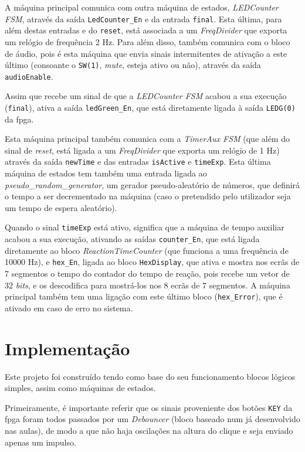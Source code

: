 \documentclass[a4paper,11pt,onecolumn]{report}
\begin{document}
A máquina principal comunica com outra máquina de estados, \textit{LEDCounter FSM}, através da saída \texttt{LedCounter\_En} e da entrada \texttt{final}. Esta última, para além destas entradas e do \texttt{reset}, está associada a um \textit{FreqDivider} que exporta um relógio de frequência 2 Hz. Para além disso, também comunica com o bloco de áudio, pois é esta máquina que envia sinais intermitentes de ativação a este último (consoante o \texttt{SW(1)}, \textit{mute}, esteja ativo ou não), através da saída \texttt{audioEnable}.

Assim que recebe um sinal de que a \textit{LEDCounter FSM} acabou a sua execução (\texttt{final}), ativa a saída \texttt{ledGreen\_En}, que está diretamente ligada à saída \texttt{LEDG(0)} da \ac{fpga}.

Esta máquina principal também comunica com a \textit{TimerAux FSM} (que além do sinal de \textit{reset}, está ligada a um \textit{FreqDivider} que exporta um relógio de 1 Hz) através da saída \texttt{newTime} e das entradas \texttt{isActive} e \texttt{timeExp}. Esta última máquina de estados tem também uma entrada ligada ao \textit{pseudo\_random\_generator}, um gerador pseudo-aleatório de números, que definirá o tempo a ser decrementado na máquina (caso o pretendido pelo utilizador seja um tempo de espera aleatório).

Quando o sinal \texttt{timeExp} está ativo, significa que a máquina de tempo auxiliar acabou a sua execução, ativando as saídas \texttt{counter\_En}, que está ligada diretamente ao bloco \textit{ReactionTimeCounter} (que funciona a uma frequência de 10000 Hz), e \texttt{hex\_En}, ligada ao bloco \texttt{HexDisplay}, que ativa e mostra nos ecrãs de 7 segmentos o tempo do contador do tempo de reação, pois recebe um vetor de 32 \textit{bits}, e os descodifica para mostrá-los nos 8 ecrãs de 7 segmentos. A máquina principal também tem uma ligação com este último bloco (\texttt{hex\_Error}), que é ativado em caso de erro no sistema.

\section{Implementação}

Este projeto foi construído tendo como base do seu funcionamento blocos lógicos simples, assim como máquinas de estados.

Primeiramente, é importante referir que os sinais proveniente dos botões \texttt{KEY} da \ac{fpga} foram todos passados por um \textit{Debouncer} (bloco baseado num já desenvolvido nas aulas), de modo a que não haja oscilações na altura do clique e seja enviado apenas um impulso.
\end{document}
